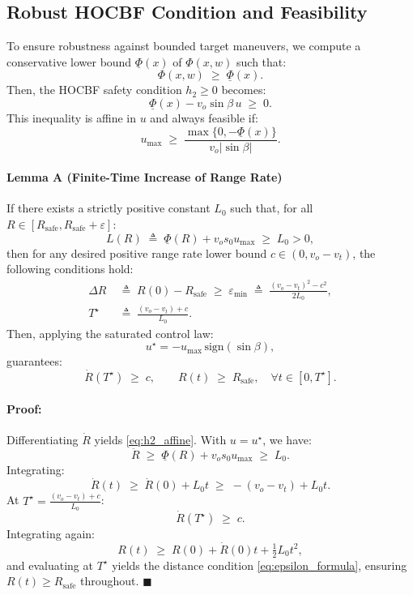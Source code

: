 \documentclass[11pt,a4paper]{article}
\numberwithin{equation}{section}
\begin{document}
\subsection{Robust HOCBF Condition and Feasibility}
\label{sec:cbf_robust}

To ensure robustness against bounded target maneuvers, we compute a conservative lower bound $\underline{\Phi}(x)$ of $\Phi(x,w)$ such that:
\[
    \Phi(x,w) \;\ge\; \underline{\Phi}(x).
\]
Then, the HOCBF safety condition $h_2 \ge 0$ becomes:
\begin{equation}
    \underline{\Phi}(x) - v_o \sin\beta \, u \;\ge\; 0.
    \label{eq:robust_cbf}
\end{equation}
This inequality is affine in $u$ and always feasible if:
\begin{equation}
    u_{\max} \;\ge\; \frac{\max\{0, -\underline{\Phi}(x)\}}{v_o |\sin\beta|}.
    \label{eq:umin_req}
\end{equation}

\paragraph*{Lemma A (Finite-Time Increase of Range Rate)}
If there exists a strictly positive constant $L_0$ such that, for all $R \in [R_{\mathrm{safe}}, R_{\mathrm{safe}} + \varepsilon]$:
\begin{equation}
    L(R) 
    \;\triangleq\; 
    \underline{\Phi}(R) + v_o s_0 u_{\max} 
    \;\ge\; L_0 > 0,
    \label{eq:L0_cond}
\end{equation}
then for any desired positive range rate lower bound $c \in (0, v_o - v_t)$, the following conditions hold:
\begin{align}
    \Delta R &\;\triangleq\; R(0) - R_{\mathrm{safe}} 
    \;\ge\; 
    \varepsilon_{\min} 
    \;\triangleq\; 
    \frac{(v_o - v_t)^2 - c^2}{2 L_0},
    \label{eq:epsilon_formula}\\
    T^\star &\;\triangleq\; \frac{(v_o - v_t) + c}{L_0}.
\end{align}
Then, applying the saturated control law:
\[
u^\star = - u_{\max} \, \mathrm{sign}(\sin\beta),
\]
guarantees:
\begin{equation}
    \dot R(T^\star) \;\ge\; c, 
    \qquad
    R(t) \;\ge\; R_{\mathrm{safe}}, 
    \quad
    \forall t \in [0, T^\star].
\end{equation}

\paragraph*{Proof:}
Differentiating $\dot R$ yields \eqref{eq:h2_affine}. With $u = u^\star$, we have:
\[
\ddot R \;\ge\; \underline{\Phi}(R) + v_o s_0 u_{\max} \;\ge\; L_0.
\]
Integrating:
\[
\dot R(t) \;\ge\; \dot R(0) + L_0 t
           \;\ge\; -(v_o - v_t) + L_0 t.
\]
At $T^\star = \frac{(v_o - v_t) + c}{L_0}$:
\[
\dot R(T^\star) \;\ge\; c.
\]
Integrating again:
\[
R(t) \;\ge\; R(0) + \dot R(0)t + \tfrac12 L_0 t^2,
\]
and evaluating at $T^\star$ yields the distance condition \eqref{eq:epsilon_formula}, ensuring $R(t) \ge R_{\mathrm{safe}}$ throughout. \hfill $\blacksquare$
\end{document}
